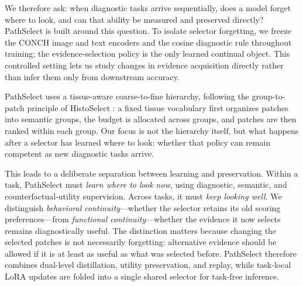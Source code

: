 \documentclass{article}
\begin{document}
We therefore ask: when diagnostic tasks arrive sequentially, does a model forget where to look, and can that ability be measured and preserved directly? PathSelect is built around this question. To isolate selector forgetting, we freeze the CONCH image and text encoders \cite{lu2024conch} and the cosine diagnostic rule throughout training; the evidence-selection policy is the only learned continual object. This controlled setting lets us study changes in evidence acquisition directly rather than infer them only from downstream accuracy.

PathSelect uses a tissue-aware coarse-to-fine hierarchy, following the group-to-patch principle of HistoSelect \cite{huang2026histoselect}: a fixed tissue vocabulary first organizes patches into semantic groups, the budget is allocated across groups, and patches are then ranked within each group. Our focus is not the hierarchy itself, but what happens after a selector has learned where to look: whether that policy can remain competent as new diagnostic tasks arrive.

This leads to a deliberate separation between learning and preservation. Within a task, PathSelect must \emph{learn where to look now}, using diagnostic, semantic, and counterfactual-utility supervision. Across tasks, it must \emph{keep looking well}. We distinguish \emph{behavioral continuity}---whether the selector retains its old scoring preferences---from \emph{functional continuity}---whether the evidence it now selects remains diagnostically useful. The distinction matters because changing the selected patches is not necessarily forgetting: alternative evidence should be allowed if it is at least as useful as what was selected before. PathSelect therefore combines dual-level distillation, utility preservation, and replay, while task-local LoRA updates are folded into a single shared selector for task-free inference.
\end{document}
